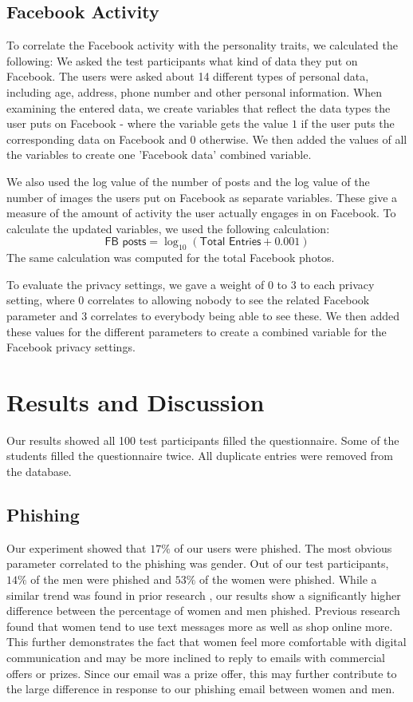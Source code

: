 \documentclass{sig-alternate}
\begin{document}
\subsection{Facebook Activity}


To correlate the Facebook activity with the personality traits, we calculated the following: We asked the test participants what kind of data they put on Facebook. The users were asked about 14 different types of personal data, including age, address,   phone number and other personal information.
When examining the entered data, we create variables that reflect the data types the user puts on Facebook - where the variable gets the value $1$ if the user puts the corresponding data on Facebook and $0$ otherwise. We then added the values of all the variables to create
one 'Facebook data' combined variable.

We also used the log value of the number of posts and the log value of the number of images the users put on Facebook as separate variables. These give a measure of the amount of activity the user actually engages in on Facebook. 
To calculate the updated variables, we used the following calculation:
$$ \textsf{FB posts} = \log_{10} (\textsf{Total Entries} + 0.001) $$
The same calculation was computed for the total Facebook photos.

To evaluate the privacy settings, we gave a weight of 0 to 3 to each privacy setting, where 0 correlates to allowing nobody to see the related Facebook parameter and 3 correlates to everybody being able to see these. We then added these values for the different parameters to create a combined variable for the Facebook privacy settings.


\section{Results and Discussion}  
\label{sec:results}
Our results showed all 100 test participants filled the questionnaire. Some of the students filled the questionnaire twice. All duplicate entries were removed from the database. 


\subsection{Phishing}

Our experiment showed that $17\%$ of our users were phished. The most obvious parameter correlated to the phishing was gender. Out of our test participants, $14\%$ of the men were phished and $53\%$ of the women were phished.
While a similar trend was found in prior research \cite {SHK10}, our results
show a significantly higher difference between the percentage of women and men phished.
Previous research \cite{SHOP} found that women tend to use text messages more as well as shop online more. This further demonstrates the fact that women feel more comfortable with digital communication and may be more inclined to reply to emails with commercial offers or prizes.
Since our email was a prize offer, this may further contribute to the large difference in response to our phishing email between women and men.
\end{document}

